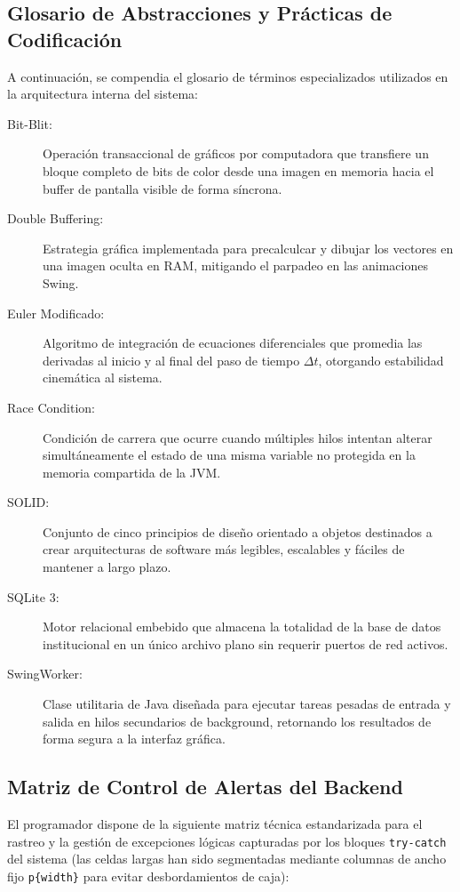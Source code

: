 \documentclass[11pt,a4paper]{article}
\begin{document}
	\subsection{Glosario de Abstracciones y Prácticas de Codificación}
	A continuación, se compendia el glosario de términos especializados utilizados en la arquitectura interna del sistema:
	\begin{description}
	\item[Bit-Blit:] Operación transaccional de gráficos por computadora que transfiere un bloque completo de bits de color desde una imagen en memoria hacia el buffer de pantalla visible de forma síncrona.
	\item[Double Buffering:] Estrategia gráfica implementada para precalculcar y dibujar los vectores en una imagen oculta en RAM, mitigando el parpadeo en las animaciones Swing.
	\item[Euler Modificado:] Algoritmo de integración de ecuaciones diferenciales que promedia las derivadas al inicio y al final del paso de tiempo $\Delta t$, otorgando estabilidad cinemática al sistema.
	\item[Race Condition:] Condición de carrera que ocurre cuando múltiples hilos intentan alterar simultáneamente el estado de una misma variable no protegida en la memoria compartida de la JVM.
	\item[SOLID:] Conjunto de cinco principios de diseño orientado a objetos destinados a crear arquitecturas de software más legibles, escalables y fáciles de mantener a largo plazo.
	\item[SQLite 3:] Motor relacional embebido que almacena la totalidad de la base de datos institucional en un único archivo plano sin requerir puertos de red activos.
	\item[SwingWorker:] Clase utilitaria de Java diseñada para ejecutar tareas pesadas de entrada y salida en hilos secundarios de background, retornando los resultados de forma segura a la interfaz gráfica.
	\end{description}
	
	\subsection{Matriz de Control de Alertas del Backend}
	El programador dispone de la siguiente matriz técnica estandarizada para el rastreo y la gestión de excepciones lógicas capturadas por los bloques \texttt{try-catch} del sistema (las celdas largas han sido segmentadas mediante columnas de ancho fijo \texttt{p\{width\}} para evitar desbordamientos de caja):
	
\end{document}
